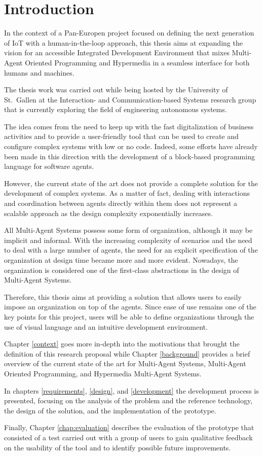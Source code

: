 \chapter{Introduction}

In the context of a Pan-Europen project focused on defining the next generation of IoT with a human-in-the-loop approach, this thesis aims at expanding the vision for an accessible Integrated Development Environment that mixes Multi-Agent Oriented Programming and Hypermedia in a seamless interface for both humans and machines.

The thesis work was carried out while being hosted by the University of St.\ Gallen at the Interaction- and Communication-based Systems research group that is currently exploring the field of engineering autonomous systems.

The idea comes from the need to keep up with the fast digitalization of business activities and to provide a user-friendly tool that can be used to create and configure complex systems with low or no code.
Indeed, some efforts have already been made in this direction with the development of a block-based programming language for software agents.

However, the current state of the art does not provide a complete solution for the development of complex systems.
As a matter of fact, dealing with interactions and coordination between agents directly within them does not represent a scalable approach as the design complexity exponentially increases.

All Multi-Agent Systems possess some form of organization, although it may be implicit and informal.
With the increasing complexity of scenarios and the need to deal with a large number of agents, the need for an explicit specification of the organization at design time became more and more evident.
Nowadays, the organization is considered one of the first-class abstractions in the design of Multi-Agent Systems.

Therefore, this thesis aims at providing a solution that allows users to easily impose an organization on top of the agents.
Since ease of use remains one of the key points for this project, users will be able to define organizations through the use of visual language and an intuitive development environment.

Chapter \ref{context} goes more in-depth into the motivations that brought the definition of this research proposal while Chapter \ref{background} provides a brief overview of the current state of the art for Multi-Agent Systems, Multi-Agent Oriented Programming, and Hypermedia Multi-Agent Systems.

In chapters \ref{requirements}, \ref{design}, and \ref{development} the development process is presented, focusing on the analysis of the problem and the reference technology, the design of the solution, and the implementation of the prototype.

Finally, Chapter \ref{chap:evaluation} describes the evaluation of the prototype that consisted of a test carried out with a group of users to gain qualitative feedback on the usability of the tool and to identify possible future improvements.